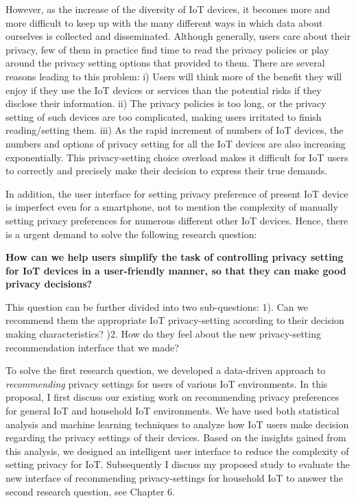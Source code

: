 However, as the increase of the diversity of IoT devices, it becomes more and more difficult to keep up with the many different ways in which data about ourselves is collected and disseminated. Although generally, users care about their privacy, few of them in practice find time to read the privacy policies or play around the privacy setting options that provided to them. There are several reasons leading to this problem: i) Users will think more of the benefit they will enjoy if they use the IoT devices or services than the potential risks if they disclose their information. ii) The privacy policies is too long, or the privacy setting of such devices are too complicated, making users irritated to finish reading/setting them. iii) As the rapid increment of numbers of IoT devices, the numbers and options of privacy setting for all the IoT devices are also increasing exponentially. This privacy-setting choice overload makes it difficult for IoT users to correctly and precisely make their decision to express their true demands. 

In addition, the user interface for setting privacy preference of present IoT device is imperfect even for a smartphone, not to mention the complexity of manually setting privacy preferences for numerous different other IoT devices. Hence, there is a urgent demand to solve the following research question: 

\textbf{How can we help users simplify the task of controlling privacy setting for IoT devices in a user-friendly manner, so that they can make good privacy decisions?}

This question can be further divided into two sub-questions: 1). Can we recommend them the appropriate IoT privacy-setting according to their decision making characteristics? )2. How do they feel about the new privacy-setting recommendation interface that we made?

To solve the first research question, we developed a data-driven approach to \emph{recommending} privacy settings for users of various IoT environments. In this proposal, I first discuss our existing work on recommending privacy preferences for general IoT and household IoT environments. We have used both statistical analysis and machine learning techniques to analyze how IoT users make decision regarding the privacy settings of their devices. Based on the insights gained from this analysis, we designed an intelligent user interface to reduce the complexity of setting privacy for IoT. Subsequently I discuss my proposed study to evaluate the new interface of recommending privacy-settings for household IoT to answer the second research question, see Chapter 6.



